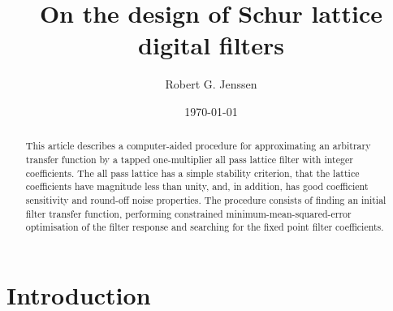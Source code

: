 \documentclass[a4paper,twoside,10pt,english]{article}
\title{On the design of Schur lattice digital filters}
\author{Robert G. Jenssen}
\date{\today}
\begin{document}
\maketitle

\begin{abstract}
  This article describes a computer-aided procedure for approximating an
  arbitrary transfer function by a tapped one-multiplier all pass lattice
  filter with integer coefficients. The all pass lattice has a simple
  stability criterion, that the lattice coefficients have magnitude less
  than unity, and, in addition, has good coefficient sensitivity and round-off
  noise properties. The procedure consists of finding an initial filter
  transfer function, performing constrained minimum-mean-squared-error
  optimisation of the filter response and searching for the fixed point
  filter coefficients.
\end{abstract}

\section{Introduction}
\end{document}
